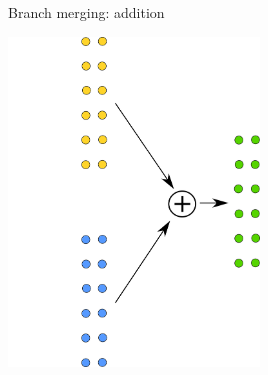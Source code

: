 \documentclass[xcolor=pdftex,dvipsnames,table,mathserif]{beamer}
\begin{document}
\begin{frame}{Branch merging: addition}

  \begin{center}
    \includegraphics[width=0.5\textwidth]{addition.png}
  \end{center}

\end{frame}







\end{document}

